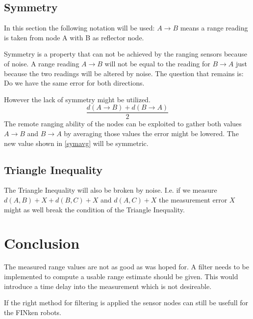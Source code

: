\subsection{Symmetry}

In this section the following notation will be used: $A \rightarrow B$ means a range reading is taken from node A with B as reflector node.

Symmetry is a property that can not be achieved by the ranging sensors because of noise. 
A range reading $A \rightarrow B$ will not be equal to the reading for $B \rightarrow A$ just because the two readings will be altered by noise.
The question that remains is: Do we have the same error for both directions.



However the lack of symmetry might be utilized.
\begin{equation}
\frac{ d(A \rightarrow B) + d(B \rightarrow A) }{2}
\label{symavg}
\end{equation}
The remote ranging ability of the nodes can be exploited to gather both values $A \rightarrow B$ and $B \rightarrow A$ by averaging those values the error might be lowered. 
The new value shown in \autoref{symavg} will be symmetric.

\subsection{Triangle Inequality}
The Triangle Inequality will also be broken by noise.
I.e. if we measure $d(A,B) + X + d(B,C) + X$ and $d(A, C) + X$ the measurement error $X$ might as well break the condition of the Triangle Inequality.


\section{Conclusion}

The measured range values are not as good as was hoped for.
A filter needs to be implemented to compute a usable range estimate should be given.
This would introduce a time delay into the measurement which is not desireable. 

If the right method for filtering is applied the sensor nodes can still be usefull for the FINken robots.
